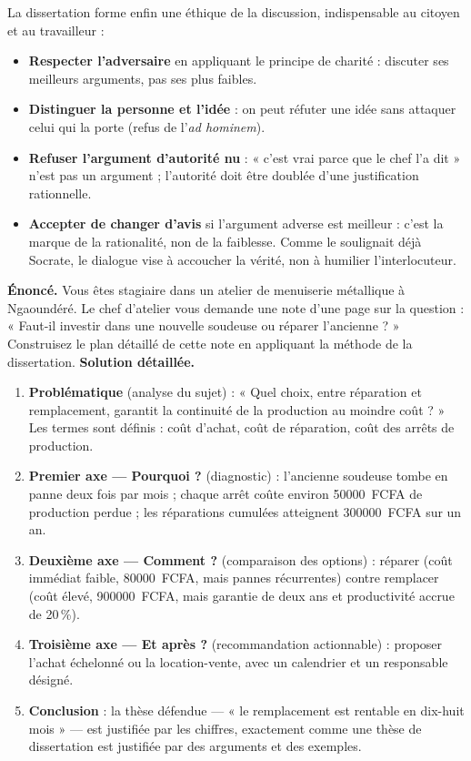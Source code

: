 \documentclass[11pt]{article}
\newcommand{\cle}[1]{{\popxbold\color{popdark}#1}}
\newcounter{popsec}
\newcounter{popsub}
\newcommand{\courssub}[1]{%
  \stepcounter{popsub}%
  \par\vspace{9pt}\noindent{\popxbold\fontsize{11.5}{13}\selectfont\color{popink}{\color{poporange}\thepopsec.\thepopsub}\hspace{6pt}#1}\par\nopagebreak\vspace{4pt}
}
\begin{document}
\courssub{L'éthique de la discussion}

La dissertation forme enfin une \cle{éthique de la discussion}, indispensable au citoyen et au travailleur :

\begin{itemize}
\item \textbf{Respecter l'adversaire} en appliquant le principe de charité : discuter ses meilleurs arguments, pas ses plus faibles.
\item \textbf{Distinguer la personne et l'idée} : on peut réfuter une idée sans attaquer celui qui la porte (refus de l'\emph{ad hominem}).
\item \textbf{Refuser l'argument d'autorité nu} : « c'est vrai parce que le chef l'a dit » n'est pas un argument ; l'autorité doit être doublée d'une justification rationnelle.
\item \textbf{Accepter de changer d'avis} si l'argument adverse est meilleur : c'est la marque de la rationalité, non de la faiblesse. Comme le soulignait déjà Socrate, le dialogue vise à accoucher la vérité, non à humilier l'interlocuteur.
\end{itemize}

\begin{exoresolu}
\textbf{Énoncé.} Vous êtes stagiaire dans un atelier de menuiserie métallique à Ngaoundéré. Le chef d'atelier vous demande une note d'une page sur la question : « Faut-il investir dans une nouvelle soudeuse ou réparer l'ancienne ? » Construisez le plan détaillé de cette note en appliquant la méthode de la dissertation.
\tcblower
\textbf{Solution détaillée.}
\begin{enumerate}
\item \textbf{Problématique} (analyse du sujet) : « Quel choix, entre réparation et remplacement, garantit la continuité de la production au moindre coût ? » Les termes sont définis : coût d'achat, coût de réparation, coût des arrêts de production.
\item \textbf{Premier axe — Pourquoi ?} (diagnostic) : l'ancienne soudeuse tombe en panne deux fois par mois ; chaque arrêt coûte environ \SI{50000}{FCFA} de production perdue ; les réparations cumulées atteignent \SI{300000}{FCFA} sur un an.
\item \textbf{Deuxième axe — Comment ?} (comparaison des options) : réparer (coût immédiat faible, \SI{80000}{FCFA}, mais pannes récurrentes) contre remplacer (coût élevé, \SI{900000}{FCFA}, mais garantie de deux ans et productivité accrue de 20\,\%).
\item \textbf{Troisième axe — Et après ?} (recommandation actionnable) : proposer l'achat échelonné ou la location-vente, avec un calendrier et un responsable désigné.
\item \textbf{Conclusion} : la thèse défendue — « le remplacement est rentable en dix-huit mois » — est justifiée par les chiffres, exactement comme une thèse de dissertation est justifiée par des arguments et des exemples.
\end{enumerate}
\end{exoresolu}
\end{document}
